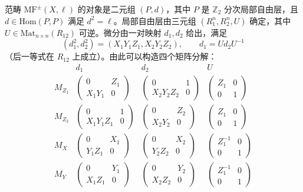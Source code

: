 \begin{example}[粘合裤子曲面得到四标记球面的镜像]
范畴 $\mathrm{MF}^{\pm}(X,\ell)$ 的对象是二元组 $(P,d)$，其中 $P$ 是 $\mathbb Z_2$ 分次局部自由层，且 $d\in\mathrm{Hom}(P,P)$ 满足 $d^2=\ell$。局部自由层由三元组 $(R_1^n,R_2^n,U)$ 确定，其中 $U\in\mathrm{Mat}_{n\times n}(R_{12})$ 可逆。微分由一对映射 $d_1,d_2$ 给出，满足
\[
  (d_1^2,d_2^2)=(X_1Y_1Z_1,X_2Y_2Z_2),\qquad d_1=Ud_2U^{-1}
\]
（后一等式在 $R_{12}$ 上成立）。由此可以构造四个矩阵分解：
{\scriptsize
\[
\begin{array}{c|c|c|c}
 &d_1&d_2&U\\\hline
M_{Z_1}&\begin{pmatrix}0&Z_1\\X_1Y_1&0\end{pmatrix}
&\begin{pmatrix}0&1\\X_2Y_2Z_2&0\end{pmatrix}
&\begin{pmatrix}Z_1&0\\0&1\end{pmatrix}\\[7pt]
M_{Z_2}&\begin{pmatrix}0&1\\X_1Y_1Z_1&0\end{pmatrix}
&\begin{pmatrix}0&Z_2\\X_2Y_2&0\end{pmatrix}
&\begin{pmatrix}Z_1&0\\0&1\end{pmatrix}\\[7pt]
M_X&\begin{pmatrix}0&X_1\\Y_1Z_1&0\end{pmatrix}
&\begin{pmatrix}0&X_2\\Y_2Z_2&0\end{pmatrix}
&\begin{pmatrix}Z_1^{-1}&0\\0&1\end{pmatrix}\\[7pt]
M_Y&\begin{pmatrix}0&Y_1\\X_1Z_1&0\end{pmatrix}
&\begin{pmatrix}0&Y_2\\X_2Z_2&0\end{pmatrix}
&\begin{pmatrix}Z_1^{-1}&0\\0&1\end{pmatrix}

\end{array}\]}
\end{example}
